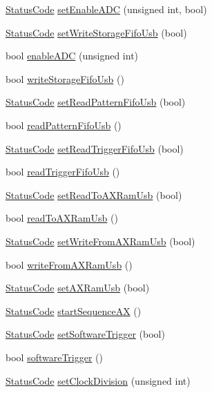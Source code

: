 \begin{DoxyCompactItemize}
\item 
\hyperlink{classStatusCode}{StatusCode} \hyperlink{classA3PE_a0c90134c3440c8b8c8dc796c43893d64}{setEnableADC} (unsigned int, bool)
\item 
\hyperlink{classStatusCode}{StatusCode} \hyperlink{classA3PE_aa688f9dff8d2892464fcd13fdf3600ad}{setWriteStorageFifoUsb} (bool)
\item 
bool \hyperlink{classA3PE_a02608198bd28bc61882f27368fd90db1}{enableADC} (unsigned int)
\item 
bool \hyperlink{classA3PE_af15048318a126074e28df1c6120d5e0d}{writeStorageFifoUsb} ()
\item 
\hyperlink{classStatusCode}{StatusCode} \hyperlink{classA3PE_a9d3ba9807ea65be0af7f23ffa2372d6b}{setReadPatternFifoUsb} (bool)
\item 
bool \hyperlink{classA3PE_a3bb47f43f9f98d8a0d825aadc04e5ab6}{readPatternFifoUsb} ()
\item 
\hyperlink{classStatusCode}{StatusCode} \hyperlink{classA3PE_a1d0dd1db3c493bc31aa56b55e7439e0e}{setReadTriggerFifoUsb} (bool)
\item 
bool \hyperlink{classA3PE_a083315774486528a8b6c40e240fbf98f}{readTriggerFifoUsb} ()
\item 
\hyperlink{classStatusCode}{StatusCode} \hyperlink{classA3PE_a7ad649611d4cc5a7743db54aa3a4f943}{setReadToAXRamUsb} (bool)
\item 
bool \hyperlink{classA3PE_af3152e461d446f442cfa7b69456ac276}{readToAXRamUsb} ()
\item 
\hyperlink{classStatusCode}{StatusCode} \hyperlink{classA3PE_aeb276fae7f19c45b4b4a3a5a2b99c337}{setWriteFromAXRamUsb} (bool)
\item 
bool \hyperlink{classA3PE_a3b4333f547a2a36fc1f38bf4ca9afa89}{writeFromAXRamUsb} ()
\item 
\hyperlink{classStatusCode}{StatusCode} \hyperlink{classA3PE_a77ccfbd9df2fad96a9a9f1dc579a7a2d}{setAXRamUsb} (bool)
\item 
\hyperlink{classStatusCode}{StatusCode} \hyperlink{classA3PE_a91ae249ca14676f8b0832487955fcf8c}{startSequenceAX} ()
\item 
\hyperlink{classStatusCode}{StatusCode} \hyperlink{classA3PE_aac0ee532f78885a25eebddbad501417f}{setSoftwareTrigger} (bool)
\item 
bool \hyperlink{classA3PE_acb2ccd6b78b39a0a9e360439b3b6f4c7}{softwareTrigger} ()
\item 
\hyperlink{classStatusCode}{StatusCode} \hyperlink{classA3PE_acf354b2c85a7e20f7f037beb278dd79d}{setClockDivision} (unsigned int)

\end{DoxyCompactItemize}
